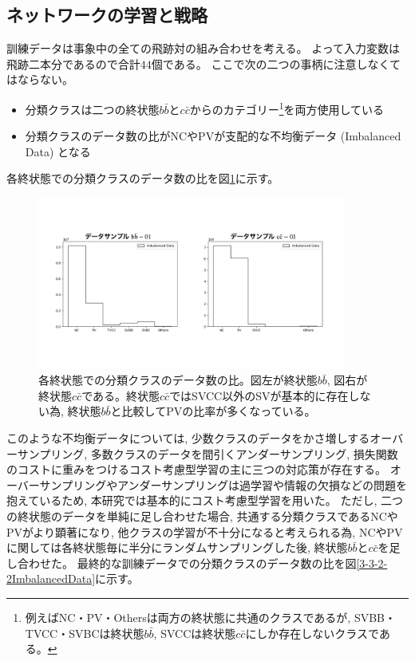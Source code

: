 \subsection{ネットワークの学習と戦略} \label{Net:PM:TrainingandStrategyofPM}

訓練データは事象中の全ての飛跡対の組み合わせを考える。
よって入力変数は飛跡二本分であるので合計$44$個である。
ここで次の二つの事柄に注意しなくてはならない。

\begin{itemize}
 \item 分類クラスは二つの終状態$b\bar{b}$と$c\bar{c}$からのカテゴリー\footnote{例えばNC・PV・Othersは両方の終状態に共通のクラスであるが, SVBB・TVCC・SVBCは終状態$b\bar{b}$, SVCCは終状態$c\bar{c}$にしか存在しないクラスである。}を両方使用している
 \item 分類クラスのデータ数の比がNCやPVが支配的な不均衡データ (Imbalanced Data) となる
\end{itemize}

各終状態での分類クラスのデータ数の比を図\ref{3-3-2-1ImbalancedData}に示す。

\begin{figure}[htbp]
 \centering
 \includegraphics[trim = 100 200 100 150, width=0.9\textwidth, clip]{Figure/3Networks/3-3-2-1ImbalancedData.png}
 \caption[各終状態での分類クラスのデータ数の比]{各終状態での分類クラスのデータ数の比。図左が終状態$b\bar{b}$, 図右が終状態$c\bar{c}$である。終状態$c\bar{c}$ではSVCC以外のSVが基本的に存在しない為, 終状態$b\bar{b}$と比較してPVの比率が多くなっている。}
 \label{3-3-2-1ImbalancedData}
\end{figure}

このような不均衡データについては, 少数クラスのデータをかさ増しするオーバーサンプリング, 多数クラスのデータを間引くアンダーサンプリング, 損失関数のコストに重みをつけるコスト考慮型学習の主に三つの対応策が存在する。
オーバーサンプリングやアンダーサンプリングは過学習や情報の欠損などの問題を抱えているため, 本研究では基本的にコスト考慮型学習を用いた。
ただし, 二つの終状態のデータを単純に足し合わせた場合, 共通する分類クラスであるNCやPVがより顕著になり, 他クラスの学習が不十分になると考えられる為, NCやPVに関しては各終状態毎に半分にランダムサンプリングした後, 終状態$b\bar{b}$と$c\bar{c}$を足し合わせた。
最終的な訓練データでの分類クラスのデータ数の比を図\ref{3-3-2-2ImbalancedData}に示す。

